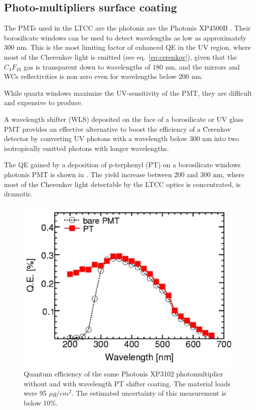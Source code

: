\subsection{Photo-multipliers surface coating}

The PMTs used in the LTCC are the photonis are the Photonis XP4500B \cite{Photonis:2007ta}.
Their borosilicate windows can be used to detect wavelengths as low as approximately
$300$ nm. This is the most limiting factor of enhanced QE in the UV region, where most of the Cherenkov
light is emitted (see eq.~\ref{eq:cerenkov}), given that the $C_4F_{10}$ gas is transparent down to
wavelengths of $180$ nm, and the mirrors and WCs reflectivities is non zero
even for wavelengths below $200$ nm.

While quartz windows maximize the UV-sensitivity of the PMT, they are difficult and expensive to produce.

A wavelength shifter (WLS) deposited on the face of a borosilicate or UV glass
PMT provides an effective alternative to boost the efficiency of a \u{C}erenkov
detector by converting UV photons with a wavelength below $300$ nm into two
isotropically emitted photons with longer wavelengths.

The QE gained by a deposition of p-terphenyl (PT) on a borosilicate windows
photonis PMT \cite{Koczon:1457653} is shown in .
The yield increase between 200 and 300 nm, where most of the Cherenkov light
detectable by the LTCC optics is concentrated, is dramatic.


\begin{figure}
	\centering
	\includegraphics[width=0.95\columnwidth,keepaspectratio]{img/pmtQuantumEfficiencyGain.png}
	\caption{Quantum efficiency of the same Photonis XP3102 photomultiplier without and with
            wavelength PT shifter coating. The material loads were 95 $\mu g/cm^2$.
            The estimated uncertainty of this measurement is below 10\%. }
	\label{fig:pmtQuantumEfficiencyGain}
\end{figure}


